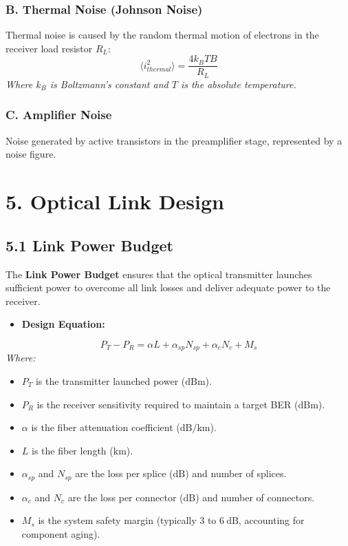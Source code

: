 \subsubsection{B. Thermal Noise (Johnson Noise)}
Thermal noise is caused by the random thermal motion of electrons in the receiver load resistor $R_L$:
\[ \langle i_{thermal}^2 \rangle = \frac{4 k_B T B}{R_L} \]
\textit{Where $k_B$ is Boltzmann's constant and $T$ is the absolute temperature.}

\subsubsection{C. Amplifier Noise}
Noise generated by active transistors in the preamplifier stage, represented by a noise figure.


\section{5. Optical Link Design}

\subsection{5.1 Link Power Budget}
The \textbf{Link Power Budget} ensures that the optical transmitter launches sufficient power to overcome all link losses and deliver adequate power to the receiver.
\begin{itemize}
  \item   \textbf{Design Equation:}
\end{itemize}
    \[ P_T - P_R = \alpha L + \alpha_{sp} N_{sp} + \alpha_c N_c + M_s \]
    \textit{Where:}
\begin{itemize}
  \item   $P_T$ is the transmitter launched power ($\text{dBm}$).
  \item   $P_R$ is the receiver sensitivity required to maintain a target BER ($\text{dBm}$).
  \item   $\alpha$ is the fiber attenuation coefficient ($\text{dB/km}$).
  \item   $L$ is the fiber length ($\text{km}$).
  \item   $\alpha_{sp}$ and $N_{sp}$ are the loss per splice ($\text{dB}$) and number of splices.
  \item   $\alpha_c$ and $N_c$ are the loss per connector ($\text{dB}$) and number of connectors.
  \item   $M_s$ is the system safety margin (typically $3 \text{ to } 6\ \text{dB}$, accounting for component aging).
\end{itemize}


